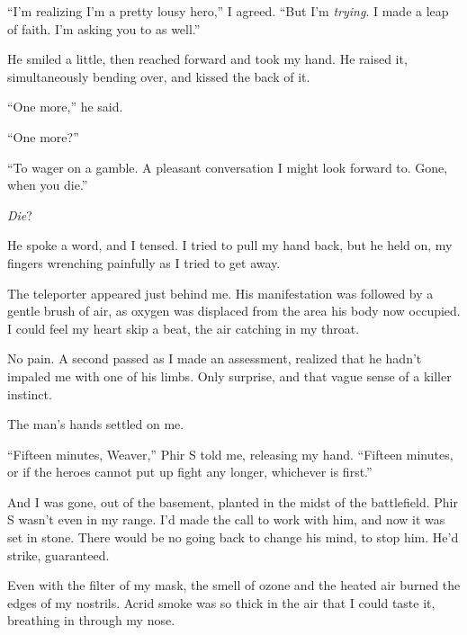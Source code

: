 ``I'm realizing I'm a pretty lousy hero,'' I agreed.  ``But I'm \emph{trying}.  I made a leap of faith.  I'm asking you to as well.''



He smiled a little, then reached forward and took my hand.  He raised it, simultaneously bending over, and kissed the back of it.



``One more,'' he said.



``One more?''



``To wager on a gamble.  A pleasant conversation I might look forward to.  Gone, when you die.''



\emph{Die}?



He spoke a word, and I tensed.  I tried to pull my hand back, but he held on, my fingers wrenching painfully as I tried to get away.



The teleporter appeared just behind me.  His manifestation was followed by a gentle brush of air, as oxygen was displaced from the area his body now occupied.  I could feel my heart skip a beat, the air catching in my throat.



No pain.  A second passed as I made an assessment, realized that he hadn't impaled me with one of his limbs.  Only surprise, and that vague sense of a killer instinct.



The man's hands settled on me.



``Fifteen minutes, Weaver,'' Phir S told me, releasing my hand.  ``Fifteen minutes, or if the heroes cannot put up fight any longer, whichever is first.''



And I was gone, out of the basement, planted in the midst of the battlefield.  Phir S wasn't even in my range.  I'd made the call to work with him, and now it was set in stone. There would be no going back to change his mind, to stop him.  He'd strike, guaranteed.



Even with the filter of my mask, the smell of ozone and the heated air burned the edges of my nostrils.  Acrid smoke was so thick in the air that I could taste it, breathing in through my nose.



